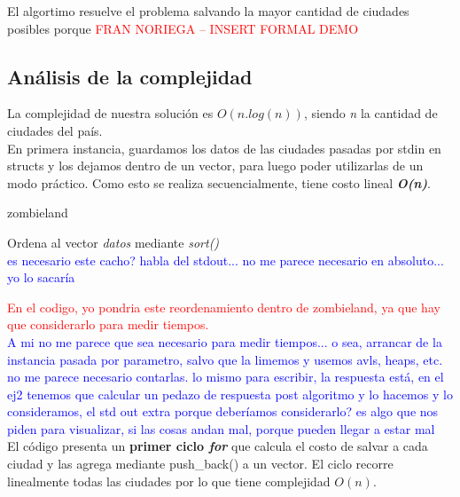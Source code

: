 El algortimo resuelve el problema salvando la mayor cantidad de ciudades posibles porque
\textcolor{red}{FRAN NORIEGA -- INSERT FORMAL DEMO}

\newpage
\subsection{An\'alisis de la complejidad}
La complejidad de nuestra soluci\'on es $O(n.log(n))$, siendo \emph{n} la cantidad de ciudades del pa\'is.\\

En primera instancia, guardamos los datos de las ciudades pasadas por stdin en structs y los dejamos dentro de un vector, para luego poder utilizarlas de un modo pr\'actico. Como esto se realiza secuencialmente, tiene costo lineal \textbf{\textit{O(n)}}.

\begin{algorithm}[h!]
\caption{zombieland}
Ordena al vector \emph{datos} mediante \textit{sort()}\\
\textcolor{blue}{es necesario este cacho? habla del stdout... no me parece necesario en absoluto... yo lo sacar\'ia}\\
\end{algorithm}
\textcolor{red}{En el codigo, yo pondria este reordenamiento dentro de zombieland, ya que hay que considerarlo para medir tiempos.}\\
\textcolor{blue}{A mi no me parece que sea necesario para medir tiempos... o sea, arrancar de la instancia pasada por parametro, salvo que la limemos y usemos avls, heaps, etc. no me parece necesario contarlas. lo mismo para escribir, la respuesta est\'a, en el ej2 tenemos que calcular un pedazo de respuesta post algoritmo y lo hacemos y lo consideramos, el std out extra porque deber\'iamos considerarlo? es algo que nos piden para visualizar, si las cosas andan mal, porque pueden llegar a estar mal}\\

El c\'odigo presenta un \textbf{primer ciclo \emph{for}} que calcula el costo de salvar a cada ciudad y las agrega mediante push_back() a un vector. El ciclo recorre linealmente todas las ciudades por lo que tiene complejidad $O(n)$. 

